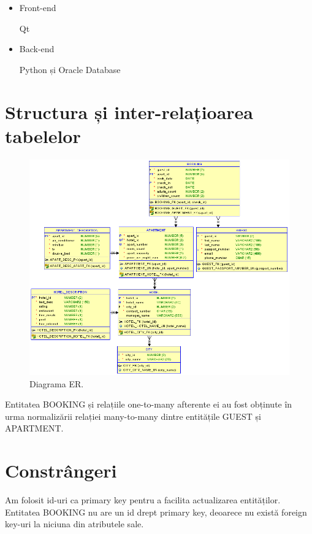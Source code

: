 \documentclass[12pt]{article}
\begin{document}
\begin{itemize}
	\item Front-end
	
	Qt

	\item Back-end

	Python și Oracle Database

\end{itemize}

\section{Structura și inter-relațioarea tabelelor}

\begin{figure}[!htb]
	\centering
	\includegraphics[width=\linewidth]{Relations.PNG}
	\caption{Diagrama ER.}\label{fig:fig1}
\end{figure}

Entitatea BOOKING și relațiile one-to-many afterente ei au fost obținute în urma normalizării relației many-to-many dintre entitățile GUEST și APARTMENT.

\section{Constrângeri}

Am folosit id-uri ca primary key pentru a facilita actualizarea entităților. Entitatea BOOKING nu are un id drept primary key, deoarece nu există foreign key-uri la niciuna din atributele sale.
\end{document}
